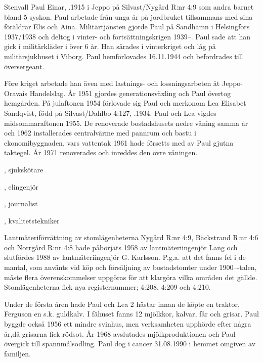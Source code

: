 Stenvall Paul Einar, .1915 i Jeppo på Silvast/Nygård R:nr 4:9 som andra barnet bland 5 syskon. Paul arbetade från unga år på jordbruket tillsammans med sina föräldrar Elis och Aina. Militärtjänsten gjorde Paul på Sandhamn i Helsingfors 1937/1938 och deltog i vinter- och fortsättningskrigen 1939--. Paul sade att han gick i militärkläder i över 6 år. Han sårades i vinterkriget och låg på militärsjukhuset i Viborg. Paul hemförlovades 16.11.1944 och befordrades till översergeant.

Före kriget arbetade han även med lastnings- och lossningsarbeten åt Jeppo-Oravais Handelslag. År 1951 gjordes generationsväxling och Paul övertog hemgården. På julaftonen 1954 förlovade sig Paul och merkonom Lea Elisabet Sandqvist, född på Silvast/Dahlbo 4:127, .1934. Paul och Lea vigdes midsommaraftonen 1955. De renoverade bostadshusets nedre våning samma år och 1962 installerades centralvärme med pannrum och bastu i ekonomibyggnaden, vars vattentak 1961 hade försetts med av Paul gjutna taktegel. År 1971 renoverades och inreddes den övre våningen.
\begin{jhchildren}
  \item {},	sjukskötare
  \item {}, elingenjör
  \item {}, journalist
  \item {}, kvalitetstekniker
\end{jhchildren}
Lantmäteriförrättning av stomlägenheterna Nygård R:nr 4:9,  Bäckstrand R:nr 4:6 och Norrgård R:nr 4:8 hade påbörjats 1958 av lantmäteriingenjör Lang och slutfördes 1988 av lantmäteriingenjör G. Karlsson. P.g.a. att det fanns fel i de mantal, som använts vid köp och försäljning av bostadstomter under 1900---talen, måste flera överenskommelser uppgöras för att klargöra vilka områden det gällde. Stomlägenheterna fick nya registernummer; 4:208, 4:209 och 4:210.

Under de första åren hade Paul och Lea 2 hästar innan de köpte en traktor, Ferguson en s.k. guldkalv. I fähuset fanns 12 mjölkkor, kalvar, får och grisar. Paul byggde också 1956 ett mindre svinhus, men verksamheten upphörde efter några år,då grisarna fick rödsot. År 1968 avslutades mjölkproduktionen och Paul övergick till spannmålsodling. Paul dog i cancer 31.08.1990 i hemmet omgiven av familjen.

